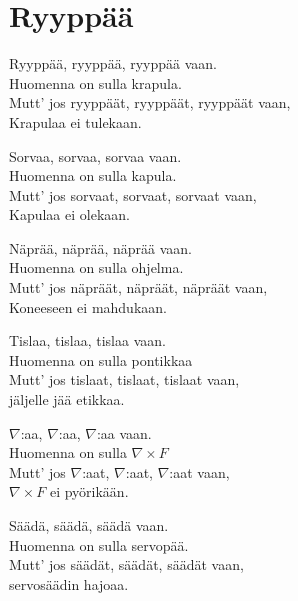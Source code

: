 \section{Ryyppää}
Ryyppää, ryyppää, ryyppää vaan.\\
Huomenna on sulla krapula.\\
Mutt’ jos ryyppäät, ryyppäät, ryyppäät vaan,\\
Krapulaa ei tulekaan.

Sorvaa, sorvaa, sorvaa vaan.\\
Huomenna on sulla kapula.\\
Mutt’ jos sorvaat, sorvaat, sorvaat vaan,\\
Kapulaa ei olekaan.

Näprää, näprää, näprää vaan.\\
Huomenna on sulla ohjelma.\\
Mutt’ jos näpräät, näpräät, näpräät vaan,\\
Koneeseen ei mahdukaan.

Tislaa, tislaa, tislaa vaan.\\
Huomenna on sulla pontikkaa\\
Mutt’ jos tislaat, tislaat, tislaat vaan,\\
jäljelle jää etikkaa.

$\nabla$:aa, $\nabla$:aa, $\nabla$:aa vaan.\\
Huomenna on sulla $\nabla \times F$\\
Mutt’ jos $\nabla$:aat, $\nabla$:aat, $\nabla$:aat vaan,\\
$\nabla \times F$ ei pyörikään.

Säädä, säädä, säädä vaan.\\
Huomenna on sulla servopää.\\
Mutt’ jos säädät, säädät, säädät vaan,\\
servosäädin hajoaa.